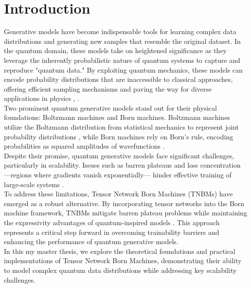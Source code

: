 \chapter{Introduction}
Generative models have become indispensable tools for learning complex data distributions and generating new samples that resemble the original dataset. In the quantum domain, these models take on heightened significance as they leverage the inherently probabilistic nature of quantum systems to capture and reproduce "quantum data." By exploiting quantum mechanics, these models can encode probability distributions that are inaccessible to classical approaches, offering efficient sampling mechanisms and paving the way for diverse applications in physics \cite{perdomo-ortiz_opportunities_2018, coyle_born_2020, sweke_quantum_2021, gao_enhancing_2022}, .
\\
Two prominent quantum generative models stand out for their physical foundations: Boltzmann machines and Born machines. Boltzmann machines utilize the Boltzmann distribution from statistical mechanics to represent joint probability distributions \cite{hinton_learning_1986}, while Born machines rely on Born's rule, encoding probabilities as squared amplitudes of wavefunctions \cite{liu_differentiable_2018, han_unsupervised_2018, perdomo-ortiz_opportunities_2018, coyle_born_2020}.
\\
Despite their promise, quantum generative models face significant challenges, particularly in scalability. Issues such as barren plateaus and loss concentration —regions where gradients vanish exponentially— hinder effective training of large-scale systems \cite{rudolph_trainability_2024}. 
\\
To address these limitations, Tensor Network Born Machines \cite{han_unsupervised_2018,cheng_tree_2019,meiburg_generative_2024,ben-dov_regularized_2025} (TNBMs) have emerged as a robust alternative. By incorporating tensor networks into the Born machine framework, TNBMs mitigate barren plateau problems while maintaining the expressivity advantages of quantum-inspired models \cite{martin_barren_2023}. This approach represents a critical step forward in overcoming trainability barriers and enhancing the performance of quantum generative models.
\\
In this my master thesis, we explore the theoretical foundations and practical implementations of Tensor Network Born Machines, demonstrating their ability to model complex quantum data distributions while addressing key scalability challenges.
\\
